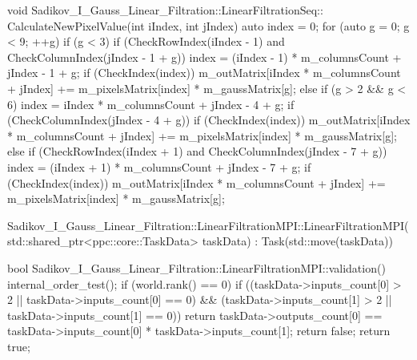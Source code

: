 \documentclass[a4paper,14pt]{report}
\begin{document}
\begin{lstlistings}
void Sadikov_I_Gauss_Linear_Filtration::LinearFiltrationSeq::
CalculateNewPixelValue(int iIndex, int jIndex) {
  auto index = 0;
  for (auto g = 0; g < 9; ++g) {
    if (g < 3) {
      if (CheckRowIndex(iIndex - 1) and CheckColumnIndex(jIndex - 1 + g)) {
        index = (iIndex - 1) * m_columnsCount + jIndex - 1 + g;
        if (CheckIndex(index)) {
          m_outMatrix[iIndex * m_columnsCount + jIndex] += 
          m_pixelsMatrix[index] * m_gaussMatrix[g];
        }
      }
    } else if (g > 2 && g < 6) {
      index = iIndex * m_columnsCount + jIndex - 4 + g;
      if (CheckColumnIndex(jIndex - 4 + g)) {
        if (CheckIndex(index)) {
          m_outMatrix[iIndex * m_columnsCount + jIndex] += 
          m_pixelsMatrix[index] * m_gaussMatrix[g];
        }
      }
    } else {
      if (CheckRowIndex(iIndex + 1) and CheckColumnIndex(jIndex - 7 + g)) {
        index = (iIndex + 1) * m_columnsCount + jIndex - 7 + g;
        if (CheckIndex(index)) {
          m_outMatrix[iIndex * m_columnsCount + jIndex] += m_pixelsMatrix[index] * m_gaussMatrix[g];
        }
      }
    }
  }
}

Sadikov_I_Gauss_Linear_Filtration::LinearFiltrationMPI::LinearFiltrationMPI(
    std::shared_ptr<ppc::core::TaskData> taskData)
    : Task(std::move(taskData)) {}

bool Sadikov_I_Gauss_Linear_Filtration::LinearFiltrationMPI::validation() {
  internal_order_test();
  if (world.rank() == 0) {
    if ((taskData->inputs_count[0] > 2 || taskData->inputs_count[0] == 0) &&
        (taskData->inputs_count[1] > 2 || taskData->inputs_count[1] == 0)) {
      return taskData->outputs_count[0] == taskData->inputs_count[0] 
      * taskData->inputs_count[1];
    }
    return false;
  }
  return true;
}


\end{lstlistings}
\end{document}
